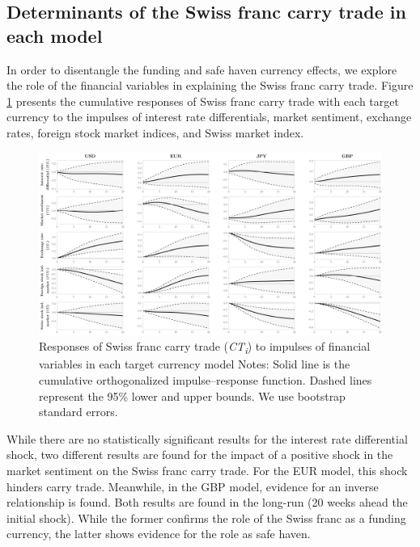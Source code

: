 \documentclass[a4paper, twoside]{templates/ociamthesis}
\begin{document}
\hypertarget{fouroneone}{%
\subsection{Determinants of the Swiss franc carry trade in each model}\label{fouroneone}}

In order to disentangle the funding and safe haven currency effects, we explore the role of the financial variables in explaining the Swiss franc carry trade. Figure \ref{fig:Figure41} presents the cumulative responses of Swiss franc carry trade with each target currency to the impulses of interest rate differentials, market sentiment, exchange rates, foreign stock market indices, and Swiss market index.

\begin{figure}[h]

{\centering \includegraphics[width=0.99\columnwidth]{figure/gALL_COIRF20_RESP20} 

}

\caption[Responses of Swiss franc carry trade (\textit{CT\textsubscript{i}}) to impulses of financial variables in each target currency model]{Responses of Swiss franc carry trade (\textit{CT\textsubscript{i}}) to impulses of financial variables in each target currency model \newline \scriptsize Notes: Solid line is the cumulative orthogonalized impulse–response function. Dashed lines represent the 95\% lower and upper bounds. We use bootstrap standard errors.}\label{fig:Figure41}
\end{figure}

While there are no statistically significant results for the interest rate differential shock, two different results are found for the impact of a positive shock in the market sentiment on the Swiss franc carry trade. For the EUR model, this shock hinders carry trade. Meanwhile, in the GBP model, evidence for an inverse relationship is found. Both results are found in the long-run (20 weeks ahead the initial shock). While the former confirms the role of the Swiss franc as a funding currency, the latter shows evidence for the role as safe haven.
\end{document}
